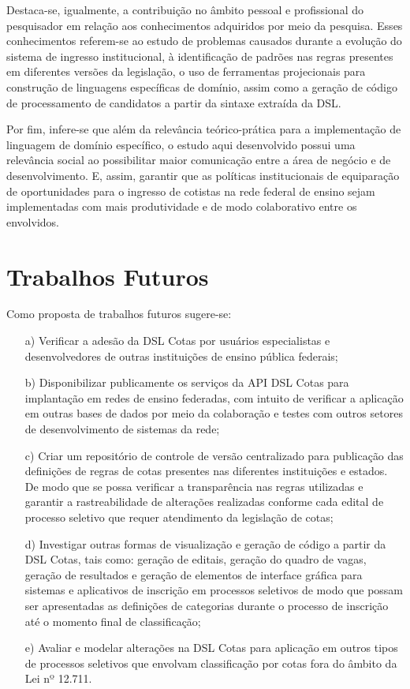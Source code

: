 Destaca-se, igualmente, a contribuição no âmbito pessoal e profissional do pesquisador em relação aos conhecimentos adquiridos por meio da pesquisa. Esses conhecimentos referem-se ao estudo de problemas causados durante a evolução do sistema de ingresso institucional, à identificação de padrões nas regras presentes em diferentes versões da legislação, o uso de ferramentas projecionais para construção de linguagens específicas de domínio, assim como a geração de código de processamento de candidatos a partir da sintaxe extraída da DSL.

Por fim, infere-se que além da relevância teórico-prática para a implementação de linguagem de domínio específico, o estudo aqui desenvolvido possui uma relevância social ao possibilitar maior comunicação entre a área de negócio e de desenvolvimento. E, assim, garantir que as políticas institucionais de equiparação de oportunidades para o ingresso de cotistas na rede federal de ensino sejam implementadas com mais produtividade e de modo colaborativo entre os envolvidos.   

\section{Trabalhos Futuros}
\label{trabalhosfuturos}

Como proposta de trabalhos futuros sugere-se:

\begin{enumerate}
    \item [a)] Verificar a adesão da DSL Cotas por usuários especialistas e desenvolvedores de outras instituições de ensino pública federais;
    \item [b)] Disponibilizar publicamente os serviços da API DSL Cotas para implantação em redes de ensino federadas, com intuito de verificar a aplicação em outras bases de dados por meio da colaboração e testes com outros setores de desenvolvimento de sistemas da rede; 
    \item [c)] Criar um repositório de controle de versão centralizado para publicação das definições de regras de cotas presentes nas diferentes instituições e estados. De modo que se possa verificar a transparência nas regras utilizadas e garantir a rastreabilidade de alterações realizadas conforme cada edital de processo seletivo que requer atendimento da legislação de cotas;
    \item [d)] Investigar outras formas de visualização e geração de código a partir da DSL Cotas, tais como: geração de editais, geração do quadro de vagas, geração de resultados e geração de elementos de interface gráfica para sistemas e aplicativos de inscrição em processos seletivos de modo que possam ser apresentadas as definições de categorias durante o processo de inscrição até o momento final de classificação;
    \item [e)] Avaliar e modelar alterações na DSL Cotas para aplicação em outros tipos de processos seletivos que envolvam classificação por cotas fora do âmbito da Lei nº 12.711.
\end{enumerate}

